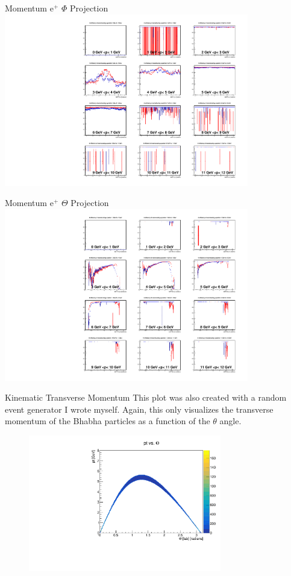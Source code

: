 \documentclass[10pt]{beamer}
\begin{document}
\begin{frame}{Momentum $\textrm{e}^+$ $\Phi$ Projection}
	\centering
	\includegraphics[width=0.8\textwidth]{Momentum/PMPhiep.pdf}
\end{frame}


\begin{frame}{Momentum $\textrm{e}^+$ $\Theta$ Projection}
	\centering
	\includegraphics[width=0.8\textwidth]{Momentum/PMThetaep.pdf}
\end{frame}




\begin{frame}{Kinematic Transverse Momentum}
	This plot was also created with a  random event generator I wrote myself. Again, this only visualizes the transverse momentum of the Bhabha particles as a function of the $\theta$ angle.
	\begin{figure}
		\centering
		\includegraphics[width=0.75\textwidth]{Plots/ptTheta.pdf}
	\end{figure}
\end{frame}
\end{document}

